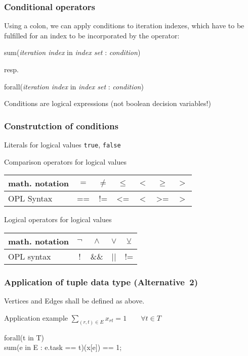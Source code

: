 \begin{frame}
 \frametitle{Conditional operators}
 Using a colon, we can apply conditions to iteration indexes, which have to be fulfilled for an index to be incorporated by the operator:
 \begin{center}\ttfamily
  sum(\textsf{\textsl{iteration index}} in \textsf{\textsl{index set}} : \textsf{\textsl{condition}})
 \end{center}
 resp. 
 \begin{center}\ttfamily
  forall(\textsf{\textsl{iteration index}} in \textsf{\textsl{index set}} : \textsf{\textsl{condition}})
 \end{center}
 Conditions are logical expressions (not boolean decision variables!)
\end{frame}

\begin{frame}
 \frametitle{Construtction of conditions}
 \begin{block}{Literals for logical values}
  \texttt{true}, \texttt{false}
 \end{block}
 \begin{block}{Comparison operators for logical values}
  \centering\ttfamily
  \begin{tabular}{lcccccc}
    \toprule
    \textrm{math. notation} & $=$ & $\neq$ & $\leq$ & $<$ & $\geq$ & $>$ \\
    \midrule
    \textrm{OPL Syntax} & == & != & <= & < & >= & >\\
    \bottomrule
  \end{tabular}
 \end{block}
 \begin{block}{Logical operators for logical values}
  \centering\ttfamily
  \begin{tabular}{lcccc}
    \toprule
    \textrm{math. notation} & $\neg$ & $\wedge$ & $\vee$ & $\veebar$\\
    \midrule
    \textrm{OPL syntax} & ! & \&\& & || & != \\
    \bottomrule
  \end{tabular}
 \end{block}
\end{frame}

\begin{frame}
 \frametitle{Application of tuple data type (Alternative~2)}
 Vertices and Edges shall be defined as above.
 
 \begin{block}{Application example}
  $\displaystyle\sum_{(r, t)\in E} x_{rt} = 1  \qquad\forall t\in T$\\
  \begin{center}
  \end{center}
  {\ttfamily forall(\alert{t} in T)\\
  \quad sum(e in E : e.task == \alert{t})(x[e]) == 1;}
 \end{block}
\end{frame}

